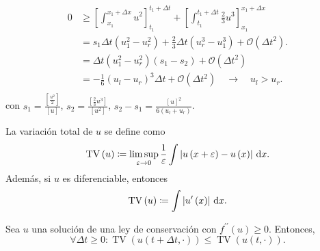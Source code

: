 \begin{align*}
	0 & \geq
	\left[
		\int_{x_{1}}^{x_{1}+\Delta x}
		u^{2}\right]_{t_1}^{t_1+\Delta t}+
	\left[
	\int_{t_{1}}^{t_{1}+\Delta t}
	\frac{2}{3}u^{3}
	\right]_{x_{1}}^{x_{1}+\Delta x}     \\
	  & =
	s_{1}\Delta t
	\left(u_{1}^{2}-u_{r}^{2}\right)+
	\frac{2}{3}
	\Delta t
	\left(u_{r}^{3}-u_{1}^{3}\right)+
	\mathcal{O}(\Delta t^{2}).           \\
	  & =
	\Delta t
	\left(u_{1}^{2}-u_{r}^{2}\right)
	\left(s_{1}-s_{2}\right)+
	\mathcal{O}\left(\Delta t^{2}\right) \\
	  & =
	-\frac{1}{6}
	\left(u_{l}-u_{r}\right)^{3}
	\Delta t+
	\mathcal{O}\left(\Delta t^{2}\right)
	\quad\to\quad
	u_{l}>u_{r}.                         \\
\end{align*}
con $s_{1}=\frac{\left[\frac{u^{2}}{2}\right]}{\left[u\right]}$,
$s_{2}=\frac{\left[\frac{2}{3}u^{3}\right]}{\left[u^{2}\right]}$,
$s_{2}-s_{1}=\frac{\left[u\right]^{2}}{6\left(u_{l}+u_{r}\right)}$.

\begin{definition}
	La variación total de $u$ se define como
	\begin{equation*}
		\operatorname{TV}\left(u\right)\coloneqq
		\limsup_{\varepsilon\to0}
		\frac{1}{\varepsilon}
		\int
		\left|
		u\left(x+\varepsilon\right)-
		u\left(x\right)
		\right|\dl x.
	\end{equation*}
	Además, si $u$ es diferenciable, entonces
	\begin{equation*}
		\operatorname{TV}\left(u\right)\coloneqq
		\int\left|u^{\prime}\left(x\right)\right|\dl x.
	\end{equation*}
\end{definition}

\begin{theorem}
	Sea $u$ una solución de una ley de conservación con
	$f^{\prime\prime}\left(u\right)\geq 0$.
	Entonces,
	\begin{equation*}
		\forall\Delta t\geq 0:
		\operatorname{TV}
		\left(u\left(t+\Delta t,\cdot\right)\right)\leq
		\operatorname{TV}
		\left(u\left(t,\cdot\right)\right).
	\end{equation*}
\end{theorem}


